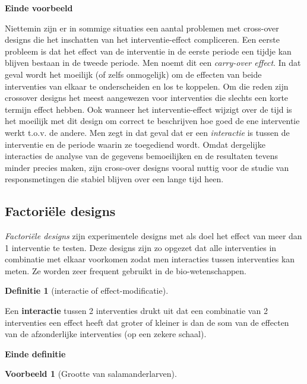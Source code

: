 \documentclass[
  12pt,dutch,coursenotes]{book}
\theoremstyle{definition}
\newtheorem{definition}{Definitie}[chapter]
\theoremstyle{definition}
\newtheorem{example}{Voorbeeld}[chapter]
\theoremstyle{definition}
\theoremstyle{remark}
\begin{document}
\textbf{Einde voorbeeld}

Niettemin zijn er in sommige situaties een aantal problemen met cross-over
designs die het inschatten van het interventie-effect compliceren. Een
eerste probleem is dat het effect van de interventie in de eerste periode
een tijdje kan blijven bestaan in de tweede periode. Men noemt dit een
\emph{carry-over effect}. In dat geval wordt het moeilijk (of zelfs
onmogelijk) om de effecten van beide interventies van elkaar te
onderscheiden en los te koppelen. Om die reden zijn crossover designs het meest aangewezen voor interventies die slechts een korte termijn effect hebben. Ook wanneer het interventie-effect wijzigt over de tijd
is het moeilijk met dit design om correct te beschrijven hoe goed
de ene interventie werkt t.o.v. de andere. Men zegt in dat geval dat er een
\emph{interactie} is tussen de interventie en de periode waarin ze
toegediend wordt. Omdat dergelijke interacties de analyse van de gegevens
bemoeilijken en de resultaten tevens minder precies maken, zijn cross-over
designs vooral nuttig voor de studie van responsmetingen die stabiel
blijven over een lange tijd heen.

\hypertarget{factoriuxeble-designs}{%
\subsection{Factoriële designs}\label{factoriuxeble-designs}}

\emph{Factoriële designs} zijn experimentele designs met als doel het effect van
meer dan 1 interventie te testen. Deze designs zijn zo opgezet dat alle interventies in combinatie met elkaar voorkomen zodat men interacties
tussen interventies kan meten. Ze worden zeer frequent gebruikt in de bio-wetenschappen.

\begin{definition}[interactie of effect-modificatie]
\protect\hypertarget{def:unnamed-chunk-78}{}{\label{def:unnamed-chunk-78} \iffalse (interactie of effect-modificatie) \fi{} }
\end{definition}
Een \textbf{interactie} tussen 2 interventies drukt uit dat een combinatie
van 2 interventies een effect heeft dat groter of kleiner is dan de som van
de effecten van de afzonderlijke interventies (op een zekere schaal).

\textbf{Einde definitie}

\begin{example}[Grootte van salamanderlarven]
\protect\hypertarget{exm:unnamed-chunk-79}{}{\label{exm:unnamed-chunk-79} \iffalse (Grootte van salamanderlarven) \fi{} }
\end{example}
\end{document}
